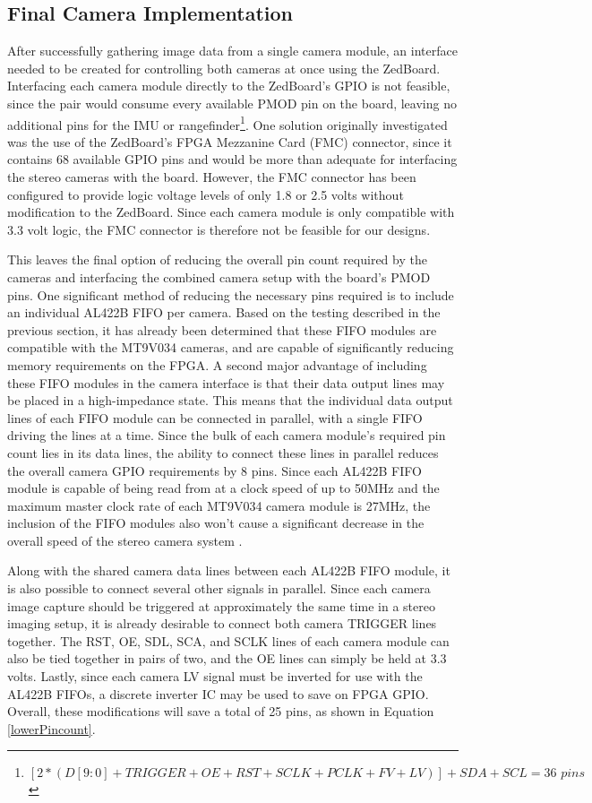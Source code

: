 \subsection{Final Camera Implementation}
After successfully gathering image data from a single camera module, an interface needed to be created for controlling both cameras at once using the ZedBoard. Interfacing each camera module directly to the ZedBoard's GPIO is not feasible, since the pair would consume every available PMOD pin on the board, leaving no additional pins for the IMU or rangefinder\footnote{$[2*(D[9:0]+TRIGGER+OE+RST+SCLK+PCLK+FV+LV)]+SDA+SCL = 36\,\,pins$}. One solution originally investigated was the use of the ZedBoard's FPGA Mezzanine Card (FMC) connector, since it contains 68 available GPIO pins and would be more than adequate for interfacing the stereo cameras with the board. However, the FMC connector has been configured to provide logic voltage levels of only 1.8 or 2.5 volts without modification to the ZedBoard. Since each camera module is only compatible with 3.3 volt logic, the FMC connector is therefore not be feasible for our designs.
\par
This leaves the final option of reducing the overall pin count required by the cameras and interfacing the combined camera setup with the board's PMOD pins. One significant method of reducing the necessary pins required is to include an individual AL422B FIFO per camera. Based on the testing described in the previous section, it has already been determined that these FIFO modules are compatible with the MT9V034 cameras, and are capable of significantly reducing memory requirements on the FPGA. A second major advantage of including these FIFO modules in the camera interface is that their data output lines may be placed in a high-impedance state. This means that the individual data output lines of each FIFO module can be connected in parallel, with a single FIFO driving the lines at a time. Since the bulk of each camera module's required pin count lies in its data lines, the ability to connect these lines in parallel reduces the overall camera GPIO requirements by 8 pins. Since each AL422B FIFO module is capable of being read from at a clock speed of up to 50MHz and the maximum master clock rate of each MT9V034 camera module is 27MHz, the inclusion of the FIFO modules also won't cause a significant decrease in the overall speed of the stereo camera system \cite{al422b,mt9v034}.
\par
Along with the shared camera data lines between each AL422B FIFO module, it is also possible to connect several other signals in parallel. Since each camera image capture should be triggered at approximately the same time in a stereo imaging setup, it is already desirable to connect both camera TRIGGER lines together. The RST, OE, SDL, SCA, and SCLK lines of each camera module can also be tied together in pairs of two, and the OE lines can simply be held at 3.3 volts. Lastly, since each camera LV signal must be inverted for use with the AL422B FIFOs, a discrete inverter IC may be used to save on FPGA GPIO. Overall, these modifications will save a total of 25 pins, as shown in Equation \ref{lowerPincount}.
